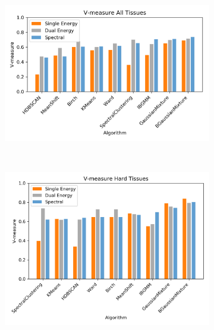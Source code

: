 \documentclass[a4paper,11pt]{article}
\begin{document}

\begin{figure}[b!]
    \centering
    \begin{subfigure}[b]{0.32\textwidth}
        \includegraphics[width=\textwidth]{figures/energy_comparison.png}
    \end{subfigure}
    ~ %
    \begin{subfigure}[b]{0.32\textwidth}
        \includegraphics[width=\textwidth]{figures/hard.png}

\end{subfigure}
\end{figure}
\end{document}

